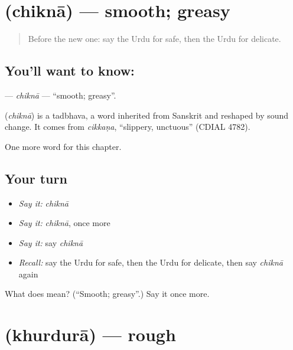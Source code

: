\section[\texorpdfstring{\ur{چکنا} (chiknā)}{چکنا (chiknā)}]{ (chiknā) — smooth; greasy}

\label{lesson:UR-C161-chikna}



\begin{quote}
Before the new one: say the Urdu for safe, then the Urdu for delicate.
\end{quote}

\subsection*{You'll want to know: }
\textbf{} — \emph{chiknā} — \textquotedblleft{}smooth; greasy\textquotedblright{}.

\begin{cousinweb}
\textbf{} (\emph{chiknā}) is a tadbhava, a word inherited from Sanskrit and reshaped by sound change. It comes from \emph{cikkaṇa}, \textquotedblleft{}slippery, unctuous\textquotedblright{} (CDIAL 4782).
\end{cousinweb}

\begin{grammarlens}[title={What you've built}]
One more word for this chapter.
\end{grammarlens}

\subsection*{Your turn}
\begin{itemize}
\raggedright
  \item \emph{Say it:} \emph{chiknā}
  \item \emph{Say it:} \emph{chiknā}, once more
  \item \emph{Say it:} say \emph{chiknā}
  \item \emph{Recall:} say the Urdu for safe, then the Urdu for delicate, then say \emph{chiknā} again
\end{itemize}

\begin{tcolorbox}[breakable,colback=teal!4,colframe=teal!35!black,title={Before you move on}]
What does  mean? (\textquotedblleft{}Smooth; greasy\textquotedblright{}.) Say it once more.
\end{tcolorbox}
\section[\texorpdfstring{\ur{کھردرا} (khurdurā)}{کھردرا (khurdurā)}]{ (khurdurā) — rough}

